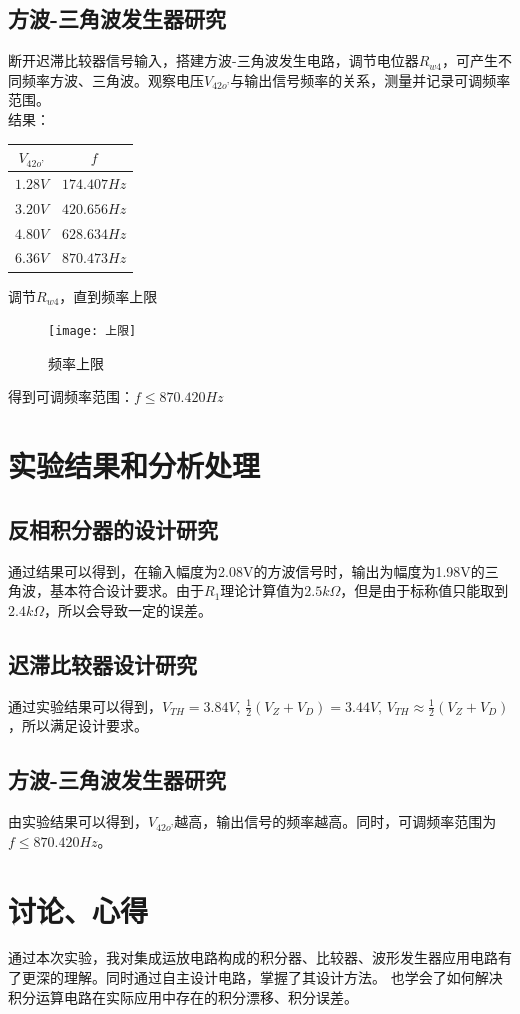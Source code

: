 \documentclass{../source/Experiment}
\begin{document}
        \subsection{方波-三角波发生器研究}
            断开迟滞比较器信号输入，搭建方波-三角波发生电路，调节电位器$R_{w4}$，可产生不同频率方波、三角波。观察电压$V_{42o’}$与输出信号频率的关系，测量并记录可调频率范围。\\
            结果： 
            \begin{table}[h]
                \centering
                \begin{tabular}{|c|c|}
                    \hline
                    $V_{42o’}$ & $f$         \\
                    \hline 
                    $1.28V$    & $174.407Hz$ \\
                    \hline 
                    $3.20V$    & $420.656Hz$ \\
                    \hline 
                    $4.80V$    & $628.634Hz$ \\
                    \hline 
                    $6.36V$    & $870.473Hz$ \\
                    \hline 
                \end{tabular}
            \end{table}

            调节$R_{w4}$，直到频率上限
            \newpage
            \begin{figure}[h]
                \centering
                \texttt{[image: 上限]}
                \caption{频率上限}
            \end{figure}

            得到可调频率范围：$f \leq 870.420Hz$
    \section{实验结果和分析处理}
        \subsection{反相积分器的设计研究}    
        通过结果可以得到，在输入幅度为2.08V的方波信号时，输出为幅度为1.98V的三角波，基本符合设计要求。由于$R_1$理论计算值为$2.5k\Omega$，但是由于标称值只能取到$2.4k\Omega$，所以会导致一定的误差。
        \subsection{迟滞比较器设计研究}
        通过实验结果可以得到，$V_{TH} = 3.84V,\, \frac{1}{2}(V_Z + V_D) = 3.44V,\, V_{TH} \approx \frac{1}{2}(V_Z + V_D)$，所以满足设计要求。
        \subsection{方波-三角波发生器研究}
        由实验结果可以得到，$V_{42o’}$越高，输出信号的频率越高。同时，可调频率范围为$f \leq 870.420Hz$。
    \section{讨论、心得}
         通过本次实验，我对集成运放电路构成的积分器、比较器、波形发生器应用电路有了更深的理解。同时通过自主设计电路，掌握了其设计方法。
         也学会了如何解决积分运算电路在实际应用中存在的积分漂移、积分误差。
\end{document}
